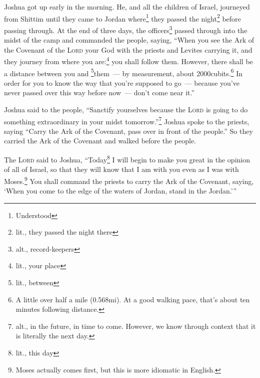 
\begin{inparaenum}
     Joshua got up early in the morning. He, and all the children of Israel, journeyed from Shittim until they came to Jordan where\footnote{Understood} they passed the night\footnote{lit., they passed the night there} before passing through.%
     At the end of three days, the officers\footnote{alt., record-keepers} passed through into the midst of the camp%
     and commanded the people, saying, ``When you see the Ark of the Covenant of the \textsc{Lord} your God with the priests and Levites carrying it, and they journey from where you are:\footnote{lit., your place} you shall follow them.%
     However, there shall be a distance between you and \footnote{lit., between}them~--- by measurement, about 2\hspace*{0.25em}000\hspace*{0.5em}cu\-bits.\footnote{A little over half a mile (0.568\thinspace mi). At a good walking pace, that's about ten minutes following distance.} In order for you to know the way that you're supposed to go~--- because you've never passed over this way before now~--- don't come near it.''%
    
     Joshua said to the people, ``Sanctify yourselves because the \textsc{Lord} is going to do something extraordinary in your midst tomorrow.''\footnote{alt., in the future, in time to come. However, we know through context that it is literally the next day.}%
     Joshua spoke to the priests, saying ``Carry the Ark of the Covenant, pass over in front of the people.'' So they carried the Ark of the Covenant and walked before the people.%
    
     The \textsc{Lord} said to Joshua, ``Today\footnote{lit., this day} I will begin to make you great in the opinion of all of Israel, so that they will know that I am with you even as I was with Moses.\footnote{Moses actually comes first, but this is more idiomatic in English.}%
     You shall command the priests to carry the Ark of the Covenant, saying, `When you come to the edge of the waters of Jordan, stand in the Jordan.'\thinspace''%
    

\end{inparaenum}
